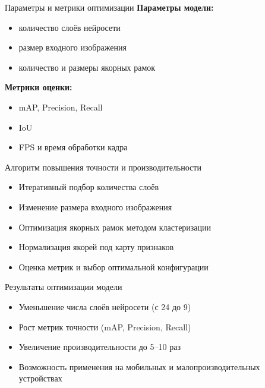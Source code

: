 \documentclass[hyperref={unicode}]{beamer}
\begin{document}
\begin{frame}{Параметры и метрики оптимизации}
\textbf{Параметры модели:}
\begin{itemize}
    \item количество слоёв нейросети
    \item размер входного изображения
    \item количество и размеры якорных рамок
\end{itemize}

\medskip
\textbf{Метрики оценки:}
\begin{itemize}
    \item mAP, Precision, Recall
    \item IoU
    \item FPS и время обработки кадра
\end{itemize}
\end{frame}

\begin{frame}{Алгоритм повышения точности и производительности}
\begin{itemize}
    \item Итеративный подбор количества слоёв
    \item Изменение размера входного изображения
    \item Оптимизация якорных рамок методом кластеризации
    \item Нормализация якорей под карту признаков
    \item Оценка метрик и выбор оптимальной конфигурации
\end{itemize}
\end{frame}

\begin{frame}{Результаты оптимизации модели}
\begin{itemize}
    \item Уменьшение числа слоёв нейросети (с 24 до 9)
    \item Рост метрик точности (mAP, Precision, Recall)
    \item Увеличение производительности до 5--10 раз
    \item Возможность применения на мобильных и малопроизводительных устройствах
\end{itemize}
\end{frame}
\end{document}
